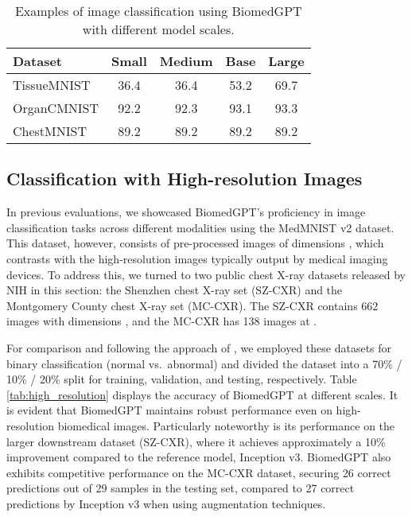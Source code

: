 \documentclass[10pt]{article} \usepackage[preprint]{tmlr}
\begin{document}
\begin{table}[htbp]
\centering
\caption{Examples of image classification using BiomedGPT with different model scales.} \label{tab:biomedgpt_large} 
\begin{tabular}{lcccc}
\toprule
Dataset & Small & Medium & Base & Large \\ \midrule
TissueMNIST & 36.4 & 36.4 & 53.2 & 69.7 \\
OrganCMNIST & 92.2 & 92.3 & 93.1 & 93.3 \\
ChestMNIST & 89.2 & 89.2 & 89.2 & 89.2 \\ \bottomrule
\end{tabular}
\end{table}

\subsection{Classification with High-resolution Images}
In previous evaluations, we showcased BiomedGPT's proficiency in image classification tasks across different modalities using the MedMNIST v2 dataset. This dataset, however, consists of pre-processed images of dimensions , which contrasts with the high-resolution images typically output by medical imaging devices. To address this, we turned to two public chest X-ray datasets released by NIH \citep{jaeger2014two} in this section: the Shenzhen chest X-ray set (SZ-CXR) and the Montgomery County chest X-ray set (MC-CXR). The SZ-CXR contains 662 images with dimensions , and the MC-CXR has 138 images at .

For comparison and following the approach of \citep{tasci2021voting}, we employed these datasets for binary classification (normal vs.\ abnormal) and divided the dataset into a 70\% / 10\% / 20\% split for training, validation, and testing, respectively. Table \ref{tab:high_resolution} displays the accuracy of BiomedGPT at different scales. It is evident that BiomedGPT maintains robust performance even on high-resolution biomedical images. Particularly noteworthy is its performance on the larger downstream dataset (SZ-CXR), where it achieves approximately a 10\% improvement compared to the reference model, Inception v3. BiomedGPT also exhibits competitive performance on the MC-CXR dataset, securing 26 correct predictions out of 29 samples in the testing set, compared to 27 correct predictions by Inception v3 when using augmentation techniques.
\end{document}
